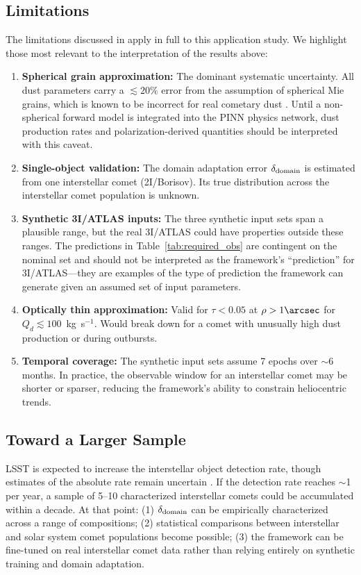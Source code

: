 \documentclass[usenatbib]{mnras}
\begin{document}
\subsection{Limitations}

The limitations discussed in \citet{paperI} apply in full to this application study. We highlight those most relevant to the interpretation of the results above:

\begin{enumerate}
    \item \textbf{Spherical grain approximation:} The dominant systematic uncertainty. All dust parameters carry a $\lesssim 20\%$ error from the assumption of spherical Mie grains, which is known to be incorrect for real cometary dust \citep{kolokolova04}. Until a non-spherical forward model is integrated into the PINN physics network, dust production rates and polarization-derived quantities should be interpreted with this caveat.
    \item \textbf{Single-object validation:} The domain adaptation error $\delta_{\rm domain}$ is estimated from one interstellar comet (2I/Borisov). Its true distribution across the interstellar comet population is unknown.
    \item \textbf{Synthetic 3I/ATLAS inputs:} The three synthetic input sets span a plausible range, but the real 3I/ATLAS could have properties outside these ranges. The predictions in Table~\ref{tab:required_obs} are contingent on the nominal set and should not be interpreted as the framework's ``prediction'' for 3I/ATLAS---they are examples of the type of prediction the framework can generate given an assumed set of input parameters.
    \item \textbf{Optically thin approximation:} Valid for $\tau < 0.05$ at $\rho > 1\arcsec$ for $Q_d \lesssim 100$~kg~s$^{-1}$. Would break down for a comet with unusually high dust production or during outbursts.
    \item \textbf{Temporal coverage:} The synthetic input sets assume 7 epochs over $\sim$6 months. In practice, the observable window for an interstellar comet may be shorter or sparser, reducing the framework's ability to constrain heliocentric trends.
\end{enumerate}

\subsection{Toward a Larger Sample}

LSST is expected to increase the interstellar object detection rate, though estimates of the absolute rate remain uncertain \citep{cook16}. If the detection rate reaches $\sim$1 per year, a sample of 5--10 characterized interstellar comets could be accumulated within a decade. At that point: (1) $\delta_{\rm domain}$ can be empirically characterized across a range of compositions; (2) statistical comparisons between interstellar and solar system comet populations become possible; (3) the framework can be fine-tuned on real interstellar comet data rather than relying entirely on synthetic training and domain adaptation.
\end{document}
